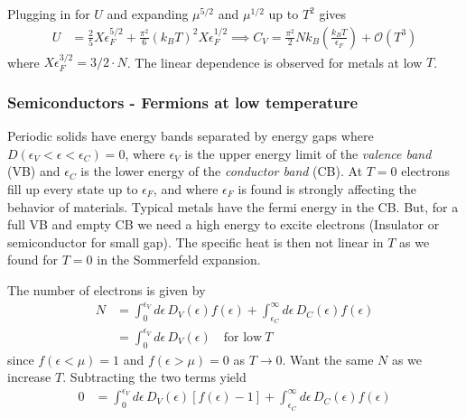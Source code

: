 \documentclass[a4paper, english, 12pt]{article}
\newcommand{\eps}{\epsilon}
\newcommand{\closed}[1]{\left( #1 \right)}
\begin{document}
\begin{multicols*}{2}
Plugging in for $U$ and expanding $\mu^{5/2}$ and $\mu^{1/2}$ up to $T^2$ gives 
\begin{align*}
    U &= \frac{2}{5}X\eps_F^{5/2} + \frac{\pi^2}{6}(k_B T)^2 X\eps_F^{1/2} \implies C_V = \frac{\pi^2}{2} Nk_B \closed{\frac{k_B T}{\eps_F}} + \mathcal{O}(T^3)
\end{align*}
where $X\eps_F^{3/2}=3/2\cdot N $. The linear dependence is observed for metals at low $T$. 


\subsubsection*{\scriptsize Semiconductors - Fermions at low temperature}

Periodic solids have energy bands separated by energy gaps where $D(\eps_V<\eps<\eps_C)=0$, where $\eps_V$ is the upper energy limit of the \textit{valence band} (VB) and $\eps_C$ is the lower energy of the \textit{conductor band} (CB). At $T=0$ electrons fill up every state up to $\eps_F$, and where $\eps_F$ is found is strongly affecting the behavior of materials. Typical metals have the fermi energy in the CB. But, for a full VB and empty CB we need a high energy to excite electrons (Insulator or semiconductor for small gap). The specific heat is then not linear in $T$ as we found for $T=0$ in the Sommerfeld expansion. 


The number of electrons is given by 
\begin{align*}
    N &= \int_0^{\eps_V} d\eps\,D_V(\eps) f(\eps) + \int_{\eps_C}^\infty d\eps\,D_C(\eps) f(\eps) \\ 
    &= \int_0^{\eps_V} d\eps\,D_V(\eps)\quad\text{for low}\: T 
\end{align*}
since $f(\eps<\mu)=1$ and $f(\eps>\mu)=0$ as $T\to 0$. Want the same $N$ as we increase $T$. Subtracting the two terms yield 
\begin{align*}
    0 &= \int_0^{\eps_V} d\eps\,D_V(\eps) [f(\eps)-1] + \int_{\eps_C}^\infty d\eps\,D_C(\eps) f(\eps)
\end{align*}


\end{multicols*}
\end{document}
